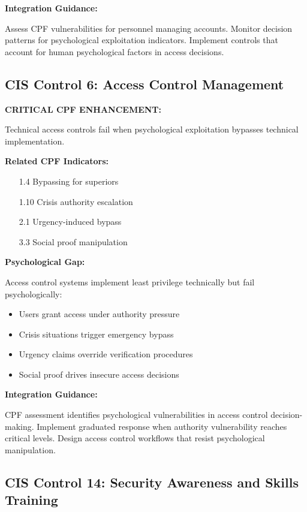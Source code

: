 \documentclass[11pt,a4paper]{article}
\begin{document}
\textbf{Integration Guidance:}

Assess CPF vulnerabilities for personnel managing accounts. Monitor decision patterns for psychological exploitation indicators. Implement controls that account for human psychological factors in access decisions.

\subsection{CIS Control 6: Access Control Management}

\textbf{CRITICAL CPF ENHANCEMENT:}

Technical access controls fail when psychological exploitation bypasses technical implementation.

\textbf{Related CPF Indicators:}
\begin{itemize}
\item [1.4] Bypassing for superiors
\item [1.10] Crisis authority escalation
\item [2.1] Urgency-induced bypass
\item [3.3] Social proof manipulation
\end{itemize}

\textbf{Psychological Gap:}

Access control systems implement least privilege technically but fail psychologically:

\begin{itemize}
\item Users grant access under authority pressure
\item Crisis situations trigger emergency bypass
\item Urgency claims override verification procedures
\item Social proof drives insecure access decisions
\end{itemize}

\textbf{Integration Guidance:}

CPF assessment identifies psychological vulnerabilities in access control decision-making. Implement graduated response when authority vulnerability reaches critical levels. Design access control workflows that resist psychological manipulation.

\subsection{CIS Control 14: Security Awareness and Skills Training}
\end{document}
